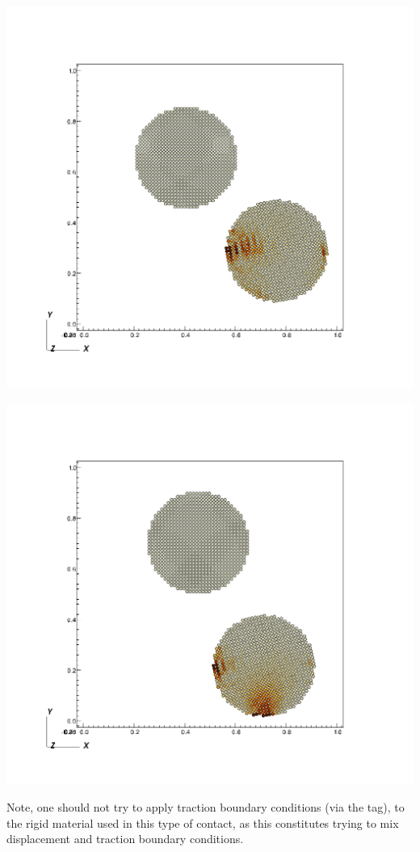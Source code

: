 \begin{minipage}[t]{0.3\textwidth}
  \centering
  \includegraphics[width=0.9\columnwidth]{FIGS/contact/specified3.png}
\end{minipage}
\begin{minipage}[t]{0.3\textwidth}
  \centering
  \includegraphics[width=0.9\columnwidth]{FIGS/contact/specified4.png}
\end{minipage}

\begin{WarningBox}
Note, one should not try to apply traction boundary conditions
(via the   tag), to the rigid material used in this type of 
contact, as this constitutes trying to mix displacement and traction boundary
conditions. 
\end{WarningBox}

